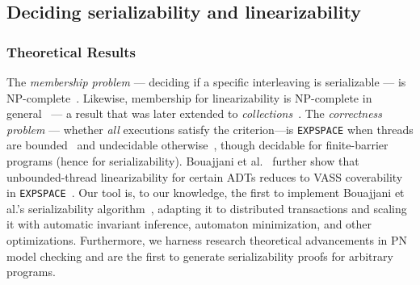 \subsection{Deciding serializability and linearizability}

\subsubsection{Theoretical Results}
The \emph{membership problem} --- deciding if a specific interleaving is serializable --- is NP-complete~\cite{Pa79,BiEn19}. Likewise, membership for linearizability is NP-complete in general~\cite{GiKo97} --- a result that was later 
extended to \textit{collections}~\cite{EmEn18}. The \emph{correctness problem} --- whether \emph{all} executions satisfy the criterion—is \texttt{EXPSPACE} when threads are bounded~\cite{AlMcPe96} and undecidable otherwise~\cite{BoEmEnHa13}, though decidable for finite-barrier programs (hence for serializability). Bouajjani et al.~\cite{BoEmEnHa18} further show that unbounded-thread linearizability for certain ADTs reduces to VASS coverability in \texttt{EXPSPACE}~\cite{Ra78}. Our tool is, to our knowledge, the first to implement Bouajjani et al.’s serializability algorithm~\cite{BoEmEnHa13}, adapting it to distributed transactions and scaling it with automatic invariant inference, automaton minimization, and other optimizations. Furthermore, we harness research theoretical advancements in PN model checking and are the first to generate serializability proofs for arbitrary programs.

